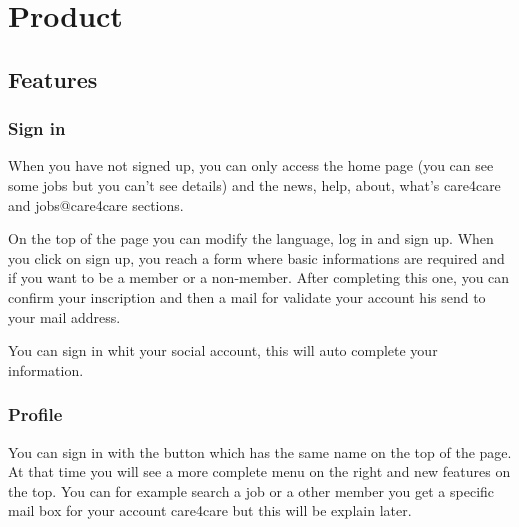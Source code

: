 \documentclass[11pt, a4paper]{article}      %
\begin{document}
\section{Product}

\subsection{Features}

\subsubsection{Sign in}

When you have not signed up, you can only access the home page (you can see some jobs but you can't see details) and the news, help, about, what's care4care and jobs@care4care sections.
\newline

On the top of the page you can modify the language, log in and sign up. When you click on sign up, you reach a form where basic informations are required and if you want to be a member or a non-member. After completing this one, you can confirm your inscription and then a mail for validate your account his send to your mail address.
\newline

You can sign in whit your social account, this will auto complete your information.

\subsubsection{Profile}

You can sign in with the button which has the same name on the top of the page. At that time you will see a more complete menu on the right and new features on the top. You can for example search a job or a other member you get a specific mail box for your account care4care but this will be explain later.
\newline
\end{document}
